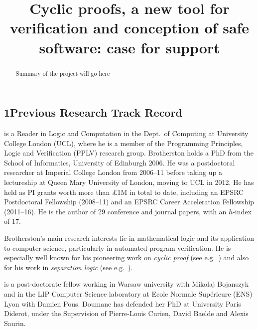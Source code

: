 \documentclass[11pt,twocolumn]{article}
\title{\textbf{
Cyclic proofs, a new tool for verification and conception of safe software: case for support
} }
\date{}
\begin{document}
\twocolumn[
\centerline{\Large Cyclic Proofs for Verification and Conception of Safe Software: Case for Support} \vspace{0.2cm}
\centerline{James Brotherston (PI) and Amina Doumane (RCI)}
\vspace{0.8cm}
]

\begin{abstract}\vspace{-0.2cm}
\footnotesize
Summary of the project will go here
\end{abstract}

\subsection*{1\quad Previous Research Track Record}

 is a Reader in Logic and Computation in the Dept.\ of Computing at University College London (UCL), where he is a member of the Programming Principles, Logic and Verification (PPLV) research group.  Brotherston holds a PhD from the School of Informatics, University of Edinburgh 2006.  He was a postdoctoral researcher at Imperial College London from 2006--11 before taking up a lectureship at Queen Mary University of London, moving to UCL in 2012. He has held as PI grants worth more than $\pounds$1M in total to date, including an EPSRC Postdoctoral Fellowship (2008--11) and an EPSRC Career Acceleration Fellowship (2011--16). He is the author of 29 conference and journal papers, with an $h$-index of $17$.

Brotherston's main research interests lie in mathematical logic and its application to computer science, particularly in automated program verification. He is especially well known for his pioneering work on \emph{cyclic proof} (see e.g.~) and also for his work in \emph{separation logic} (see e.g.~).

\medskip{}  is a post-doctorate fellow working in Warsaw university with Mikolaj Bojanszyk and in the
LIP Computer Science laboratory at Ecole Normale
Supérieure (ENS) Lyon with Damien Pous.
Doumane has defended her PhD at University Paris Diderot,
under the Supervision of Pierre-Louis Curien, David
Baelde and Alexis Saurin.
\end{document}
